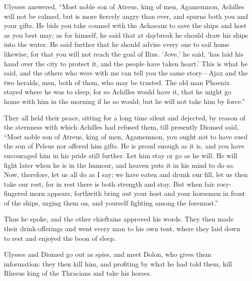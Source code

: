 Ulysses answered, “Most noble son of Atreus, king of men, Agamemnon,
Achilles will not be calmed, but is more fiercely angry than ever, and
spurns both you and your gifts. He bids you take counsel with the Achaeans
to save the ships and host as you best may; as for himself, he said that
at daybreak he should draw his ships into the water. He said further that
he should advise every one to sail home likewise, for that you will not
reach the goal of Ilius. ‘Jove,’ he said, ‘has laid his hand over the city
to protect it, and the people have taken heart.’ This is what he said, and
the others who were with me can tell you the same story—Ajax and the
two heralds, men, both of them, who may be trusted. The old man Phoenix
stayed where he was to sleep, for so Achilles would have it, that he might
go home with him in the morning if he so would; but he will not take him
by force.”

They all held their peace, sitting for a long time silent and dejected, by
reason of the sternness with which Achilles had refused them, till
presently Diomed said, “Most noble son of Atreus, king of men, Agamemnon,
you ought not to have sued the son of Peleus nor offered him gifts. He is
proud enough as it is, and you have encouraged him in his pride still
further. Let him stay or go as he will. He will fight later when he is in
the humour, and heaven puts it in his mind to do so. Now, therefore, let
us all do as I say; we have eaten and drunk our fill, let us then take our
rest, for in rest there is both strength and stay. But when fair
rosy-fingered morn appears, forthwith bring out your host and your
horsemen in front of the ships, urging them on, and yourself fighting
among the foremost.”

Thus he spoke, and the other chieftains approved his words. They then made
their drink-offerings and went every man to his own tent, where they laid
down to rest and enjoyed the boon of sleep.


Ulysses and Diomed go out as spies, and meet Dolon, who gives them
information: they then kill him, and profiting by what he had told them,
kill Rhesus king of the Thracians and take his horses.

